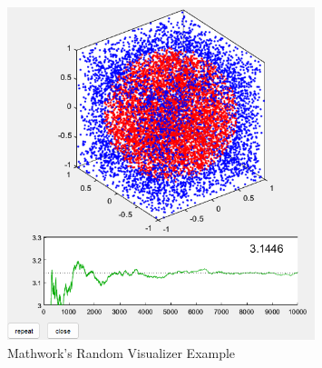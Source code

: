 \begin{figure}[H]
    \centering
    \includegraphics[width=0.8\textwidth]{Include/Images/Thesis/Development/Visualizers/RANDOMNESS/Mathworks.Random.Ex1.png}
    \caption{Mathwork's Random Visualizer Example}
    \label{fig:Mathwork's Random Visualizer Example}
\end{figure}

